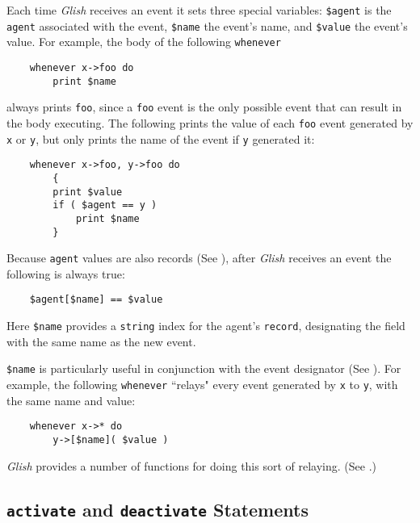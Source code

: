 Each time {\em Glish} receives an event it sets three special variables:
{\tt \$agent} is the {\tt agent} associated with the event, {\tt \$name}
the event's name, and {\tt \$value} the event's value.  For example,
the body of the following {\tt whenever}
\begin{verbatim}
    whenever x->foo do
        print $name
\end{verbatim}
always prints {\tt foo}, since a {\tt foo} event is the only possible
event that can result in the body executing.  The following prints
the value of each {\tt foo} event generated by {\tt x} or {\tt y},
but only prints the name of the event if {\tt y} generated it:
\begin{verbatim}
    whenever x->foo, y->foo do
        {
        print $value
        if ( $agent == y )
            print $name
        }
\end{verbatim}
Because {\tt agent} values are also records (See ),
after {\em Glish} receives an event the following is always true:
\begin{verbatim}
    $agent[$name] == $value
\end{verbatim}
Here {\tt \$name} provides a {\tt string} index for the agent's {\tt record},
designating the field with the same name as the new event.

{\tt \$name} is particularly useful in conjunction with the {\tt *}
event designator (See ).  For example, the following
{\tt whenever} ``relays" every event generated by {\tt x} to {\tt y},
with the same name and value:
\begin{verbatim}
    whenever x->* do
        y->[$name]( $value )
\end{verbatim}
{\em Glish} provides a number of functions for 
doing this sort of relaying. (See .)

\subsection{{\tt activate} and {\tt deactivate} Statements}
\label{activate-stmt}

